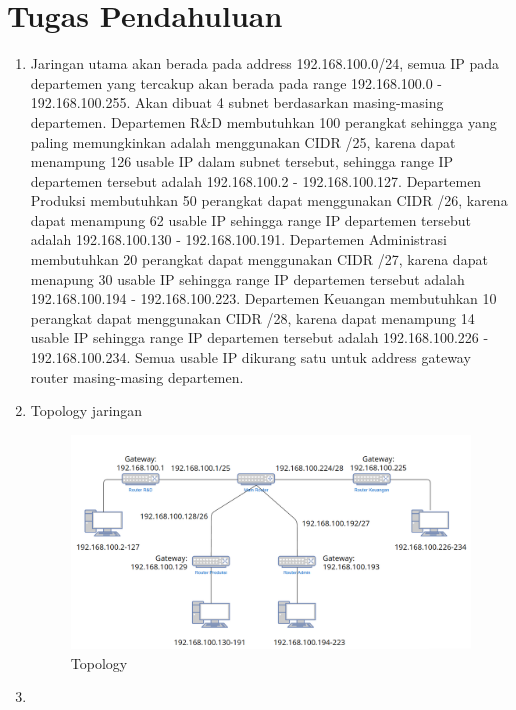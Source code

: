\section{Tugas Pendahuluan}
\begin{enumerate}
	\item Jaringan utama akan berada pada address 192.168.100.0/24, semua IP pada departemen yang tercakup akan berada pada range 192.168.100.0 - 192.168.100.255. Akan dibuat 4 subnet berdasarkan masing-masing departemen. Departemen R\&D membutuhkan 100 perangkat sehingga yang paling memungkinkan adalah menggunakan CIDR /25, karena dapat menampung 126 usable IP dalam subnet tersebut, sehingga range IP departemen tersebut adalah 192.168.100.2 - 192.168.100.127. Departemen Produksi membutuhkan 50 perangkat dapat menggunakan CIDR /26, karena dapat menampung 62 usable IP sehingga range IP departemen tersebut adalah 192.168.100.130 - 192.168.100.191. Departemen Administrasi membutuhkan 20 perangkat dapat menggunakan CIDR /27, karena dapat menapung 30 usable IP sehingga range IP departemen tersebut adalah 192.168.100.194 - 192.168.100.223. Departemen Keuangan membutuhkan 10 perangkat dapat menggunakan CIDR /28, karena dapat menampung 14 usable IP sehingga range IP departemen tersebut adalah 192.168.100.226 - 192.168.100.234. Semua usable IP dikurang satu untuk address gateway router masing-masing departemen.
	\item Topology jaringan
    \begin{figure}[H]
	    \centering
	    \includegraphics[width=1\linewidth]{Cover/img/topologi.png}
	    \caption{Topology}
	    \label{fig:enter-label}
	\end{figure}
		\item  \hspace{2cm}
        \begin{tabular}{|c|c|c|c|c|}

\end{tabular}
\end{enumerate}
